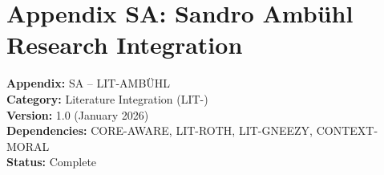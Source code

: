 
\chapter*{Appendix SA: Sandro Ambühl Research Integration}
\label{app:ambuhl}

\begin{tcolorbox}[colback=white,colframe=black!75!white,title=Appendix Metadata]
\textbf{Appendix:} SA -- LIT-AMBÜHL \\
\textbf{Category:} Literature Integration (LIT-) \\
\textbf{Version:} 1.0 (January 2026) \\
\textbf{Dependencies:} CORE-AWARE, LIT-ROTH, LIT-GNEEZY, CONTEXT-MORAL \\
\textbf{Status:} Complete
\end{tcolorbox}


